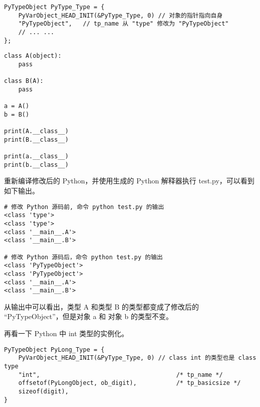 \documentclass[12pt]{article}
\begin{document}
\begin{lstlisting}[caption={修改 typeobject.c}]
PyTypeObject PyType_Type = {
    PyVarObject_HEAD_INIT(&PyType_Type, 0) // 对象的指针指向自身
    "PyTypeObject",   // tp_name 从 "type" 修改为 "PyTypeObject"
    // ... ...
};
\end{lstlisting}

\begin{lstlisting}[caption={创建 test.py}]
class A(object):
    pass

class B(A):
    pass

a = A()
b = B()

print(A.__class__)
print(B.__class__)

print(a.__class__)
print(b.__class__)
\end{lstlisting}

重新编译修改后的 Python，并使用生成的 Python 解释器执行 test.py，可以看到如下输出。

\newpage
\begin{lstlisting}[caption={test.py 运行输出}]
# 修改 Python 源码前, 命令 python test.py 的输出
<class 'type'>
<class 'type'>
<class '__main__.A'>
<class '__main__.B'>

# 修改 Python 源码后，命令 python test.py 的输出
<class 'PyTypeObject'>
<class 'PyTypeObject'>
<class '__main__.A'>
<class '__main__.B'>
\end{lstlisting}

从输出中可以看出，类型 A 和类型 B 的类型都变成了修改后的 “PyTypeObject”，但是对象 a 和 对象 b 的类型不变。

再看一下 Python 中 int 类型的实例化。

\begin{lstlisting}[caption={int 类型类的实例化}]
PyTypeObject PyLong_Type = {
    PyVarObject_HEAD_INIT(&PyType_Type, 0) // class int 的类型也是 class type
    "int",                                      /* tp_name */
    offsetof(PyLongObject, ob_digit),           /* tp_basicsize */
    sizeof(digit), 
}

\end{lstlisting}
\end{document}
